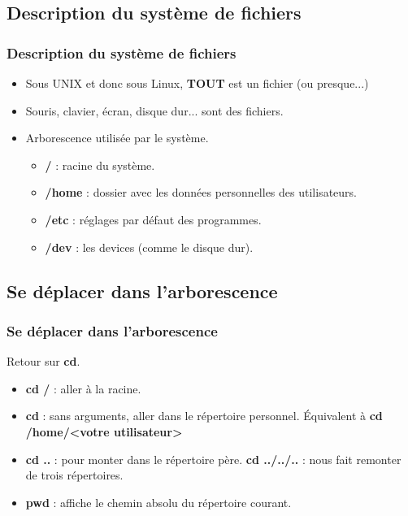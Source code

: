 \documentclass{beamer}
\begin{document}
    \subsection{Description du système de fichiers}
    \begin{frame}
        \frametitle{Description du système de fichiers}
        \begin{itemize}
            \item Sous UNIX et donc sous Linux, {\bf TOUT} est un fichier (ou presque...)
            \item Souris, clavier, écran, disque dur... sont des fichiers.
            \item Arborescence utilisée par le système.
                \begin{itemize}
                    \item {\bf /} : racine du système.
                    \item {\bf /home} : dossier avec les données personnelles des utilisateurs.
                    \item {\bf /etc} : réglages par défaut des programmes.
                    \item {\bf /dev} : les devices (comme le disque dur).
                \end{itemize}
        \end{itemize}
    \end{frame}

    \subsection{Se déplacer dans l'arborescence}
    \begin{frame}
        \frametitle{Se déplacer dans l'arborescence}
        Retour sur {\bf cd}.
        \begin{itemize}
            \item {\bf cd /} : aller à la racine.
            \item {\bf cd} : sans arguments, aller dans le répertoire personnel.\newline
                Équivalent à {\bf cd /home/<votre utilisateur>}
            \item {\bf cd ..} : pour monter dans le répertoire père.\newline
                {\bf cd ../../..} : nous fait remonter de trois répertoires.
            \item {\bf pwd} : affiche le chemin absolu du répertoire courant. 
        \end{itemize}
    \end{frame}
\end{document}
